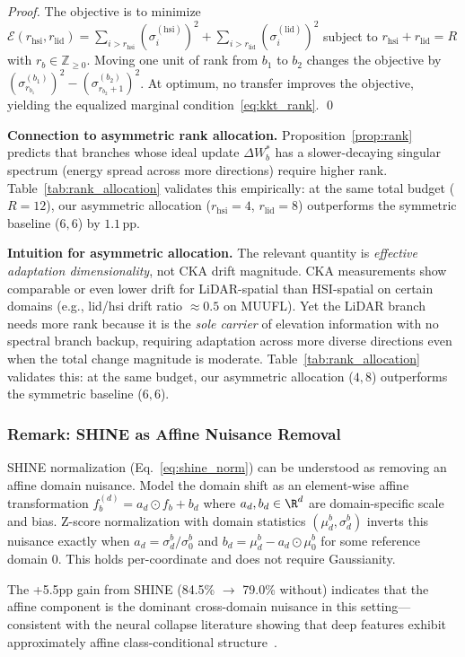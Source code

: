 \begin{proof}
The objective is to minimize $\mathcal{E}(r_{\mathrm{hsi}}, r_{\mathrm{lid}}) = \sum_{i > r_{\mathrm{hsi}}} (\sigma_i^{(\mathrm{hsi})})^2 + \sum_{i > r_{\mathrm{lid}}} (\sigma_i^{(\mathrm{lid})})^2$ subject to $r_{\mathrm{hsi}} + r_{\mathrm{lid}} = R$ with $r_b \in \mathbb{Z}_{\geq 0}$.
Moving one unit of rank from $b_1$ to $b_2$ changes the objective by $(\sigma_{r_{b_1}}^{(b_1)})^2 - (\sigma_{r_{b_2}+1}^{(b_2)})^2$.
At optimum, no transfer improves the objective, yielding the equalized marginal condition~\eqref{eq:kkt_rank}. \qed
\end{proof}

\textbf{Connection to asymmetric rank allocation.}
Proposition~\ref{prop:rank} predicts that branches whose ideal update $\Delta W_b^*$ has a slower-decaying singular spectrum (energy spread across more directions) require higher rank.
Table~\ref{tab:rank_allocation} validates this empirically: at the same total budget ($R{=}12$), our asymmetric allocation ($r_{\mathrm{hsi}}{=}4$, $r_{\mathrm{lid}}{=}8$) outperforms the symmetric baseline ($6,6$) by $1.1$\,pp.

\textbf{Intuition for asymmetric allocation.}
The relevant quantity is \emph{effective adaptation dimensionality}, not CKA drift magnitude.
CKA measurements show comparable or even lower drift for LiDAR-spatial than HSI-spatial on certain domains (e.g., lid/hsi drift ratio ${\approx}0.5$ on MUUFL).
Yet the LiDAR branch needs more rank because it is the \emph{sole carrier} of elevation information with no spectral branch backup, requiring adaptation across more diverse directions even when the total change magnitude is moderate.
Table~\ref{tab:rank_allocation} validates this: at the same budget, our asymmetric allocation ($4,8$) outperforms the symmetric baseline ($6,6$).

\subsubsection{Remark: SHINE as Affine Nuisance Removal}
\label{app:shine_remark}

SHINE normalization (Eq.~\ref{eq:shine_norm}) can be understood as removing an affine domain nuisance.
Model the domain shift as an element-wise affine transformation $f_b^{(d)} = a_d \odot f_b + b_d$ where $a_d, b_d \in \R^d$ are domain-specific scale and bias.
Z-score normalization with domain statistics $(\mu_d^b, \sigma_d^b)$ inverts this nuisance exactly when $a_d = \sigma_d^b / \sigma_0^b$ and $b_d = \mu_d^b - a_d \odot \mu_0^b$ for some reference domain 0.
This holds per-coordinate and does not require Gaussianity.

The +5.5pp gain from SHINE (84.5\% $\to$ 79.0\% without) indicates that the affine component is the dominant cross-domain nuisance in this setting---consistent with the neural collapse literature showing that deep features exhibit approximately affine class-conditional structure~\cite{papyan2020prevalence}.
